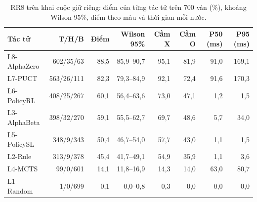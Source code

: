 \begin{table}[H]
  \centering\footnotesize
  \caption{RR8 trên khai cuộc giữ riêng: điểm của từng tác tử trên 700 ván (\%), khoảng Wilson 95\%, điểm theo màu và thời gian mỗi nước.}
  \label{tab:rr8-giu-rieng}
  \setlength{\tabcolsep}{4pt}
  \begin{tabular}{@{}lrrrrrrr@{}}
    \toprule
    Tác tử & T/H/B & Điểm & Wilson 95\% & Cầm X & Cầm O & P50 (ms) & P95 (ms) \\
    \midrule
    L8-AlphaZero & 602/35/63 & 88{,}5 & 85{,}9--90{,}7 & 95{,}1 & 81{,}9 & 91{,}0 & 169{,}1 \\
    L7-PUCT & 563/26/111 & 82{,}3 & 79{,}3--84{,}9 & 92{,}1 & 72{,}4 & 91{,}6 & 170{,}3 \\
    L6-PolicyRL & 408/25/267 & 60{,}1 & 56{,}4--63{,}6 & 73{,}0 & 47{,}1 & 1{,}2 & 1{,}5 \\
    L3-AlphaBeta & 398/32/270 & 59{,}1 & 55{,}5--62{,}7 & 69{,}7 & 48{,}6 & 5{,}7 & 34{,}0 \\
    L5-PolicySL & 348/9/343 & 50{,}4 & 46{,}7--54{,}0 & 57{,}7 & 43{,}0 & 1{,}1 & 1{,}5 \\
    L2-Rule & 313/9/378 & 45{,}4 & 41{,}7--49{,}1 & 54{,}9 & 35{,}9 & 1{,}1 & 3{,}6 \\
    L4-MCTS & 99/0/601 & 14{,}1 & 11{,}8--16{,}9 & 14{,}3 & 14{,}0 & 63{,}0 & 80{,}7 \\
    L1-Random & 1/0/699 & 0{,}1 & 0{,}0--0{,}8 & 0{,}3 & 0{,}0 & 0{,}0 & 0{,}0 \\
    \bottomrule
  \end{tabular}
\end{table}
